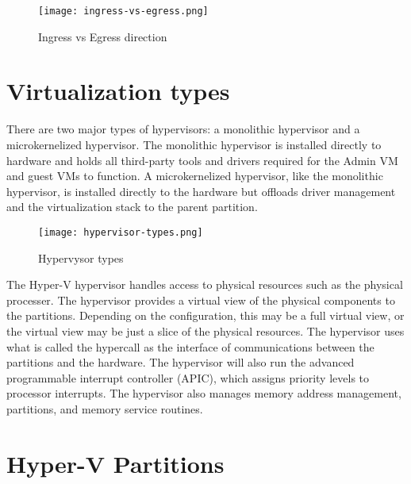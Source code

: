 \vspace{5mm}

\begin{figure}[h]
\centering
\texttt{[image: ingress-vs-egress.png]}
\caption{Ingress vs Egress direction}
\label{ingress-vs-egress}
\end{figure}

\vspace{5mm}
\section{Virtualization types}
\vspace{5mm}
There are two major types of hypervisors: a monolithic hypervisor and a microkernelized hypervisor. The monolithic hypervisor is installed directly to hardware and holds
all third-party tools and drivers required for the Admin VM and guest VMs to function. A microkernelized hypervisor, like the monolithic hypervisor, is installed directly to the
hardware but offloads driver management and the virtualization stack to the parent partition. \cite{BOOK:3}

\vspace{5mm}

\begin{figure}[h]
\centering
\texttt{[image: hypervisor-types.png]}
\caption{Hypervysor types}
\label{hypervisor-types}
\end{figure}

\vspace{5mm}

The Hyper-V hypervisor handles access to physical resources such as the physical processer. The hypervisor provides a virtual view of the physical components to the
partitions. Depending on the configuration, this may be a full virtual view, or the virtual view may be just a slice of the physical resources. The hypervisor uses what is called the
hypercall as the interface of communications between the partitions and the hardware. The hypervisor will also run the advanced programmable interrupt controller (APIC),
which assigns priority levels to processor interrupts. The hypervisor also manages memory address management, partitions, and memory service routines.

\vspace{5mm}
\section{Hyper-V Partitions}
\vspace{5mm}

